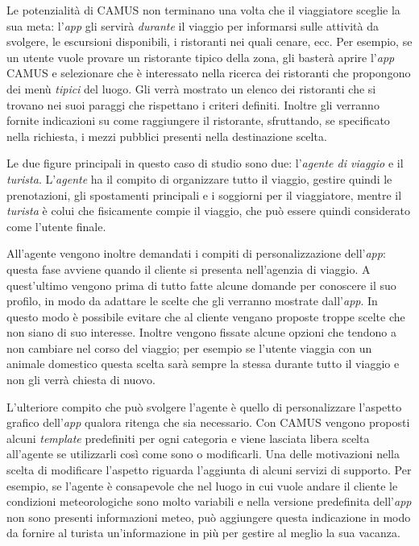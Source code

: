Le potenzialità di CAMUS non terminano una volta che il viaggiatore sceglie la sua meta: l'\emph{app} gli servirà \emph{durante} il viaggio per informarsi sulle attività da svolgere, le escursioni disponibili, i ristoranti nei quali cenare, ecc. Per esempio, se un utente vuole provare un ristorante tipico della zona, gli basterà aprire l'\emph{app} CAMUS e selezionare che è interessato nella ricerca dei ristoranti che propongono dei menù \emph{tipici} del luogo. Gli verrà mostrato un elenco dei ristoranti che si trovano nei suoi paraggi che rispettano i criteri definiti. Inoltre gli verranno fornite indicazioni su come raggiungere il ristorante, sfruttando, se specificato nella richiesta, i mezzi pubblici presenti nella destinazione scelta.

Le due figure principali in questo caso di studio sono due: l'\emph{agente di viaggio} e il \emph{turista}. L'\emph{agente} ha il compito di organizzare tutto il viaggio, gestire quindi le prenotazioni, gli spostamenti principali e i soggiorni per il viaggiatore, mentre il \emph{turista} è colui che fisicamente compie il viaggio, che può essere quindi considerato come l'utente finale.

All'agente vengono inoltre demandati i compiti di personalizzazione dell'\emph{app}: questa fase avviene quando il cliente si presenta nell'agenzia di viaggio. A quest'ultimo vengono prima di tutto fatte alcune domande per conoscere il suo profilo, in modo da adattare le scelte che gli verranno mostrate dall'\emph{app}. In questo modo è possibile evitare che al cliente vengano proposte troppe scelte che non siano di suo interesse. Inoltre vengono fissate alcune opzioni che tendono a non cambiare nel corso del viaggio; per esempio se l'utente viaggia con un animale domestico questa scelta sarà sempre la stessa durante tutto il viaggio e non gli verrà chiesta di nuovo.%

L'ulteriore compito che può svolgere l'agente è quello di personalizzare l'aspetto grafico dell'\emph{app} qualora ritenga che sia necessario. Con CAMUS vengono proposti alcuni \emph{template} predefiniti per ogni categoria e viene lasciata libera scelta all'agente se utilizzarli così come sono o modificarli. Una delle motivazioni nella scelta di modificare l'aspetto riguarda l'aggiunta di alcuni servizi di supporto. Per esempio, se l'agente è consapevole che nel luogo in cui vuole andare il cliente le condizioni meteorologiche sono molto variabili e nella versione predefinita dell'\emph{app} non sono presenti informazioni meteo, può aggiungere questa indicazione in modo da fornire al turista un'informazione in più per gestire al meglio la sua vacanza.

